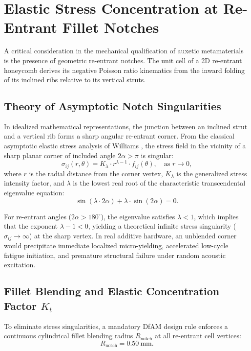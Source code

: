 \section{Elastic Stress Concentration at Re-Entrant Fillet Notches}
\label{sec:notch_stress}

A critical consideration in the mechanical qualification of auxetic metamaterials is the presence of geometric re-entrant notches. The unit cell of a 2D re-entrant honeycomb derives its negative Poisson ratio kinematics from the inward folding of its inclined ribs relative to its vertical struts.

\subsection{Theory of Asymptotic Notch Singularities}
In idealized mathematical representations, the junction between an inclined strut and a vertical rib forms a sharp angular re-entrant corner. From the classical asymptotic elastic stress analysis of Williams \cite{williams1952}, the stress field in the vicinity of a sharp planar corner of included angle $2\alpha > \pi$ is singular:
\begin{equation}
\sigma_{ij}(r, \theta) = K_{\lambda} \cdot r^{\lambda - 1} \cdot f_{ij}(\theta), \quad \text{as } r \to 0,
\label{eq:williams_singularity}
\end{equation}
where $r$ is the radial distance from the corner vertex, $K_{\lambda}$ is the generalized stress intensity factor, and $\lambda$ is the lowest real root of the characteristic transcendental eigenvalue equation:
\begin{equation}
\sin(\lambda \cdot 2\alpha) + \lambda \cdot \sin(2\alpha) = 0.
\label{eq:transcendental_williams}
\end{equation}

For re-entrant angles ($2\alpha > 180^\circ$), the eigenvalue satisfies $\lambda < 1$, which implies that the exponent $\lambda - 1 < 0$, yielding a theoretical infinite stress singularity ($\sigma_{ij} \to \infty$) at the sharp vertex. In real additive hardware, an unblended corner would precipitate immediate localized micro-yielding, accelerated low-cycle fatigue initiation, and premature structural failure under random acoustic excitation.

\subsection{Fillet Blending and Elastic Concentration Factor \texorpdfstring{$K_t$}{Kt}}
To eliminate stress singularities, a mandatory DfAM design rule enforces a continuous cylindrical fillet blending radius $R_{\text{notch}}$ at all re-entrant cell vertices:
\begin{equation}
R_{\text{notch}} = \SI{0.50}{\milli\meter}.
\label{eq:fillet_radius}
\end{equation}

